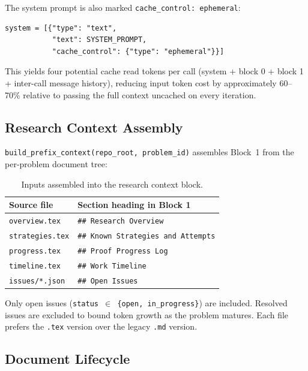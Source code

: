 \documentclass[11pt]{article}
\begin{document}
The system prompt is also marked \texttt{cache\_control: ephemeral}:
\begin{lstlisting}
system = [{"type": "text",
           "text": SYSTEM_PROMPT,
           "cache_control": {"type": "ephemeral"}}]
\end{lstlisting}
This yields four potential cache read tokens per call (system + block 0 + block 1
+ inter-call message history), reducing input token cost by approximately
60--70\% relative to passing the full context uncached on every iteration.

\subsection{Research Context Assembly}

\texttt{build\_prefix\_context(repo\_root, problem\_id)} assembles Block~1
from the per-problem document tree:

\begin{table}[h]
\centering
\small
\begin{tabularx}{\linewidth}{@{}lX@{}}
\toprule
\textbf{Source file} & \textbf{Section heading in Block 1} \\
\midrule
\texttt{overview.tex}   & \texttt{\#\# Research Overview} \\
\texttt{strategies.tex} & \texttt{\#\# Known Strategies and Attempts} \\
\texttt{progress.tex}   & \texttt{\#\# Proof Progress Log} \\
\texttt{timeline.tex}   & \texttt{\#\# Work Timeline} \\
\texttt{issues/*.json}  & \texttt{\#\# Open Issues} \\
\bottomrule
\end{tabularx}
\caption{Inputs assembled into the research context block.}
\end{table}

Only open issues (\texttt{status $\in$ \{open, in\_progress\}}) are included.
Resolved issues are excluded to bound token growth as the problem matures.
Each file prefers the \texttt{.tex} version over the legacy \texttt{.md} version.

\subsection{Document Lifecycle}
\end{document}
